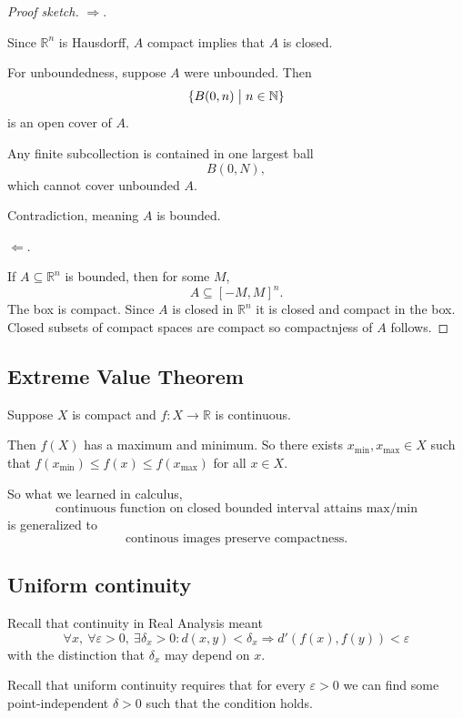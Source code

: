 \documentclass[11pt]{article}
\begin{document}
\begin{proof}[Proof sketch]
    $\Rightarrow$. 

    Since $\mathbb R^n$ is Hausdorff, $A$ compact 
    implies that $A$ is closed. 

    For unboundedness, suppose $A$ were unbounded. 
    Then 
    \[
        \{B(0,n) \bigm| n \in \mathbb N\}
    \]
    is an open cover of $A$. 

    Any finite subcollection is contained in one largest ball 
    \[
        B(0,N), 
    \]
    which cannot cover unbounded $A$. 

    Contradiction, meaning $A$ is bounded. 

    $\Leftarrow$. 

    If $A \subseteq \mathbb R^n$ is bounded, then 
    for some $M$, 
    \[
        A \subseteq [-M,M]^n. 
    \]
    The box is compact. 
    Since $A$ is closed in $\mathbb R^n$ it is closed 
    and compact in the box. 
    Closed subsets of compact spaces are compact 
    so compactnjess of $A$ follows. 
\end{proof}

\subsection{Extreme Value Theorem}

Suppose $X$ is compact and $f : X \to \mathbb R$ 
is continuous. 

Then $f(X)$ has a maximum and minimum. 
So there exists $x_{\min}, x_{\max} \in X$ 
such that $f(x_{\min}) \leq f(x) \leq f(x_{\max})$ 
for all $x \in X$.  

So what we learned in calculus, 
\[
    \text{continuous function on closed bounded interval 
    attains max/min}
\]
is generalized to 
\[
    \text{continous images preserve compactness}. 
\]

\subsection{Uniform continuity}

Recall that continuity in Real Analysis meant 
\[
    \forall x, \ \forall \varepsilon > 0, \
    \exists \delta_x > 0 : d(x,y) < \delta_x  
    \Rightarrow d'(f(x), f(y)) < \varepsilon 
\]
with the distinction that 
$\delta_x$ may depend on $x$. 

Recall that uniform continuity requires that 
for every $\varepsilon > 0$ we can find some 
point-independent $\delta > 0$ such that the 
condition holds. 
\end{document}
